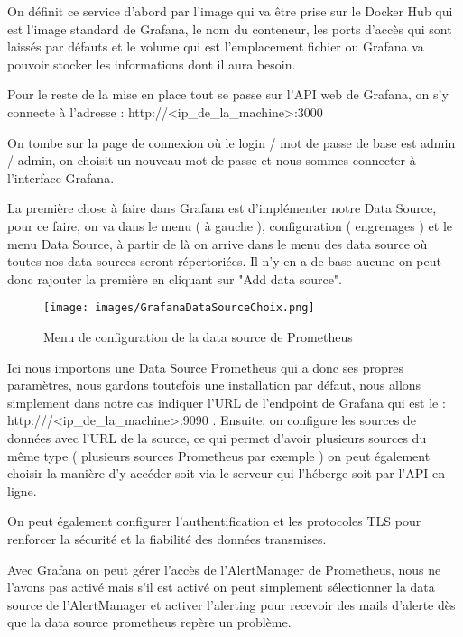 \documentclass[oneside,12pt]{report}
\begin{document}
On définit ce service d'abord par l'image qui va être prise sur le Docker Hub qui est l'image standard de Grafana, le nom du conteneur, les ports d'accès qui sont laissés par défauts et le volume qui est l'emplacement fichier ou Grafana va pouvoir stocker les informations dont il aura besoin.\newline 

Pour le reste de la mise en place tout se passe sur l'API web de Grafana, on s'y connecte à l'adresse : http://<ip\_de\_la\_machine>:3000\newline

On tombe sur la page de connexion où le login / mot de passe de base est admin / admin, on choisit un nouveau mot de passe et nous sommes connecter à l'interface Grafana.\newline

La première chose à faire dans Grafana est d'implémenter notre Data Source, pour ce faire, on va dans le menu ( à gauche ), configuration ( engrenages ) et le menu Data Source, à partir de là on arrive dans le menu des data source où toutes nos data sources seront répertoriées. Il n'y en a de base aucune on peut donc rajouter la première en cliquant sur "Add data source".\newline

\begin{figure}[H]
    \centering
    \texttt{[image: images/GrafanaDataSourceChoix.png]}
    \caption{Menu de configuration de la data source de Prometheus}
    \label{fig:mesh1}
\end{figure}

Ici nous importons une Data Source Prometheus qui a donc ses propres paramètres, nous gardons toutefois une installation par défaut, nous allons simplement dans notre cas indiquer l'URL de l'endpoint de Grafana qui est le : http:///<ip\_de\_la\_machine>:9090 . Ensuite, on configure les sources de données avec l'URL de la source, ce qui permet d'avoir plusieurs sources du même type ( plusieurs sources Prometheus par exemple ) on peut également choisir la manière d'y accéder soit via le serveur qui l'héberge soit par l'API en ligne.

On peut également configurer l'authentification et les protocoles TLS pour renforcer la sécurité et la fiabilité des données transmises.\newline

Avec Grafana on peut gérer l'accès de l'AlertManager de Prometheus, nous ne l'avons pas activé mais s'il est activé on peut simplement sélectionner la data source de l'AlertManager et activer l'alerting pour recevoir des mails d'alerte dès que la data source prometheus repère un problème.\newline 
\end{document}
